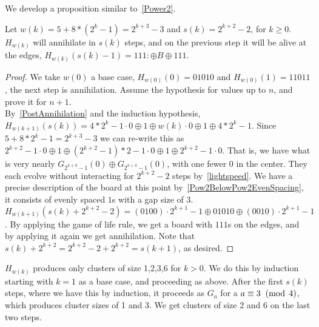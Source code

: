 \documentclass[12pt,letterpaper]{article}
\begin{document}
We develop a proposition similar to~\cref{Power2}.
\begin{prop}\label{101BoardsBig} %
  Let $w(k)=5+8*(2^k-1)=2^{k+3}-3$ and $s(k)=2^{k+2}-2$, for $k\geq 0$. 
  $H_{w(k)}$ will annihilate in $s(k)$ steps, and on the previous step it will be alive at the edges, $H_{w(k)}(s(k)-1)=111:\oplus B\oplus 111$.
\end{prop}
\begin{proof}
  We take $w(0)$ a base case, $H_{w(0)}(0)=01010$ and $H_{w(0)}(1)=11011$, the next step is annihilation. Assume the hypothesis for values up to $n$, and prove it for $n+1$. \\
  By~\cref{PostAnnihilation} and the induction hypothesis, $H_{w(k+1)}(s(k))=4*2^k-1\cdot 0 \oplus 1\oplus w(k)\cdot 0 \oplus 1 \oplus 4*2^k-1$. Since $5+8*2^k-1 = 2^{k+3}-3$ we can re-write this as $2^{k+2}-1\cdot 0 \oplus 1\oplus (2^{k+2}-1)*2-1\cdot 0\oplus 1\oplus 2^{k+2}-1\cdot 0$. That is, we have what is very nearly $G_{2^{k+3}-1}(0)\oplus G_{2^{k+3}-1}(0)$, with one fewer 0 in the center. They each evolve without interacting for $2^{k+2}-2$ steps by~\cref{lightspeed}. We have a precise description of the board at this point by~\cref{Pow2BelowPow2EvenSpacing}, it consists of evenly spaced $1$s with a gap size of $3$. $H_{w(k+1)}(s(k)+2^{k+2}-2)=(0100)\cdot 2^{k+1}-1\oplus 01010 \oplus (0010)\cdot 2^{k+1}-1$. By applying the game of life rule, we get a board with $111$s on the edges, and by applying it again we get annihilation. Note that $s(k)+2^{k+2} = 2^{k+2}-2+2^{k+2}=s(k+1)$, as desired.
\end{proof}
\begin{cor}
  $H_{w(k)}$ produces only clusters of size 1,2,3,6 for $k>0$. We do this by induction starting with $k=1$ as a base case, and proceeding as above. After the first $s(k)$ steps, where we have this by induction, it proceeds as $G_a$ for a $a\equiv 3 \;\;(\operatorname{mod}\;4)$, which produces cluster sizes of 1 and 3. We get clusters of size 2 and 6 on the last two steps.
\end{cor}
\end{document}
